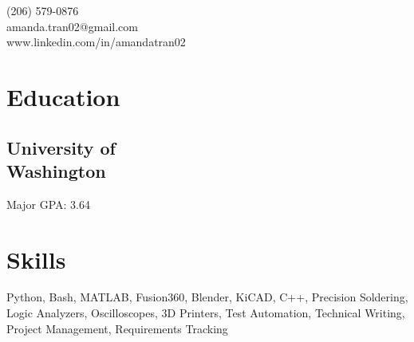 \documentclass[]{hieudo-build}
\begin{document}
%
%
{
	\phone \hspace{0.1mm} {(206) 579-0876}\\
	\faEnvelope \hspace{0.1mm} {amanda.tran02@gmail.com}\\
	\faLinkedinSquare \hspace{0.1mm} {www.linkedin.com/in/amandatran02}
}
    
%
%
\begin{minipage}[t]{0.22\textwidth} 

\section{Education} 
\subsection{University of \\Washington}
Major GPA: 3.64\\
\sectionsep

\section{Skills}
Python, Bash, MATLAB, Fusion360, Blender, KiCAD, C++, Precision Soldering, Logic Analyzers, Oscilloscopes, 3D Printers, Test Automation, Technical Writing, Project Management, Requirements Tracking 
\sectionsep

\end{minipage}
\end{document}
